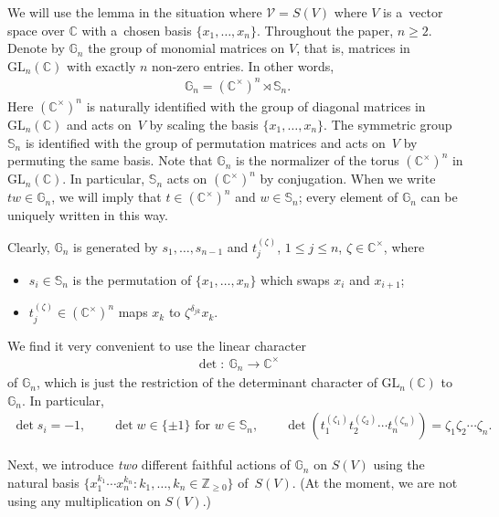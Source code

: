 \documentclass[pdftex]{sigma}
\begin{document}
We will use the lemma in the situation where $\mathcal V = S(V)$ where $V$ is a~vector space over $\mathbb C$ with
a~chosen basis $\{x_1,\ldots,x_n\}$.
Throughout the paper, $n\ge 2$.
Denote by $\mathbb G_n$ the group of monomial matrices on $V$, that is, matrices in $\mathrm{GL}_n(\mathbb C)$ with
exactly $n$ non-zero entries.
In other words,
\begin{gather*}
\mathbb G_n=(\mathbb C^\times)^n\rtimes \mathbb S_n.
\end{gather*}
Here $(\mathbb C^\times)^n$ is naturally identif\/ied with the group of diagonal matrices in $\mathrm{GL}_n(\mathbb C)$
and acts on~$V$ by scaling the basis $\{x_1,\ldots,x_n\}$.
The symmetric group $\mathbb S_n$ is identif\/ied with the group of permutation matrices and acts on~$V$ by permuting the
same basis.
Note that $\mathbb G_n$ is the normalizer of the torus $(\mathbb C^\times)^n$ in $\mathrm{GL}_n(\mathbb C)$.
In particular, $\mathbb S_n$ acts on $(\mathbb C^\times)^n$ by conjugation.
When we write $tw\in \mathbb G_n$, we will imply that $t\in (\mathbb C^\times)^n$ and $w\in \mathbb S_n$; every element
of $\mathbb G_n$ can be uniquely written in this way.

Clearly, $\mathbb G_n$ is generated by $s_1,\ldots,s_{n-1}$ and $t_j^{(\zeta)}$, $1\le j\le n$, $\zeta\in \mathbb
C^\times$, where
\begin{itemize}\itemsep=0pt
\item
$s_i\in \mathbb S_n$ is the permutation of $\{x_1,\ldots,x_n\}$ which swaps $x_i$ and $x_{i+1}$;
\item
$t_j^{(\zeta)}\in (\mathbb C^\times)^n$ maps $x_k$ to $\zeta^{\delta_{jk}} x_k$.
\end{itemize}
We f\/ind it very convenient to use the linear character
\begin{gather*}
\det \colon \ \mathbb G_n \to \mathbb C^\times
\end{gather*}
of $\mathbb G_n$, which is just the restriction of the determinant character of $\mathrm{GL}_n(\mathbb C)$ to $\mathbb
G_n$.
In particular,
\begin{gather*}
\det s_i = -1,
\qquad
\det w\in\{\pm1\}\text{ for }w\in \mathbb S_n,
\qquad
\det\left(t_1^{(\zeta_1)} t_2^{(\zeta_2)} \cdots t_n^{(\zeta_n)}\right)=\zeta_1\zeta_2\cdots \zeta_n.
\end{gather*}

{\sloppy Next, we introduce \textit{two} dif\/ferent faithful actions of $\mathbb G_n$ on $S(V)$ using the natural basis
$\big\{x_1^{k_1} \cdots x_n^{k_n} :  k_1,\ldots,k_n\in \mathbb Z_{\ge0}\big\}$ of~$S(V)$.
(At the moment, we are not using any multiplication on $S(V)$.)

}
\end{document}
